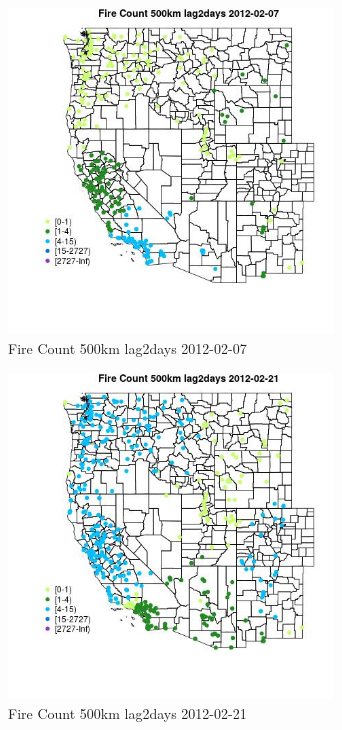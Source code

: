 \begin{figure} 
\centering  
\includegraphics[width=0.77\textwidth]{Code_Outputs/Report_ML_input_PM25_Step4_part_f_de_duplicated_aveswNAs_MapObsFire_Count_500km_lag2days2012-02-07.jpg} 
\caption{\label{fig:Report_ML_input_PM25_Step4_part_f_de_duplicated_aveswNAsMapObsFire_Count_500km_lag2days2012-02-07}Fire Count 500km lag2days 2012-02-07} 
\end{figure} 
 

\begin{figure} 
\centering  
\includegraphics[width=0.77\textwidth]{Code_Outputs/Report_ML_input_PM25_Step4_part_f_de_duplicated_aveswNAs_MapObsFire_Count_500km_lag2days2012-02-21.jpg} 
\caption{\label{fig:Report_ML_input_PM25_Step4_part_f_de_duplicated_aveswNAsMapObsFire_Count_500km_lag2days2012-02-21}Fire Count 500km lag2days 2012-02-21} 
\end{figure} 
 


